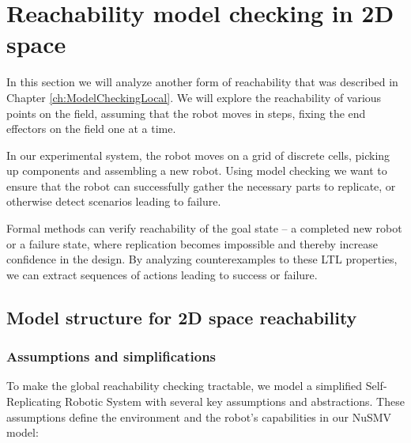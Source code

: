 \newpage
\section{Reachability model checking in 2D space}
\label{ch:global}


In this section we will analyze  another form of reachability that was described in 
Chapter \ref{ch:ModelCheckingLocal}. 
We will explore the reachability of various points on the field, assuming 
that the robot moves in steps, fixing the end effectors on the field one 
at a time.  

In our experimental system, the robot moves on 
a grid of discrete cells, picking up components and assembling a new 
robot. Using model checking we want to ensure that the robot can 
successfully gather the necessary parts to replicate, or otherwise detect 
scenarios leading to failure.

Formal methods can verify reachability of 
the goal state -- a completed new robot or a failure state, where replication 
becomes impossible and thereby increase confidence in the design. 
By analyzing counterexamples to these LTL properties, 
we can extract sequences of actions leading to success or failure.

\subsection{Model structure for 2D space reachability}

\subsubsection{Assumptions and simplifications}

To make the global reachability checking tractable, we model a simplified 
Self-Replicating Robotic System with several key assumptions and abstractions. 
These assumptions define the environment and the robot's capabilities in our NuSMV model:


